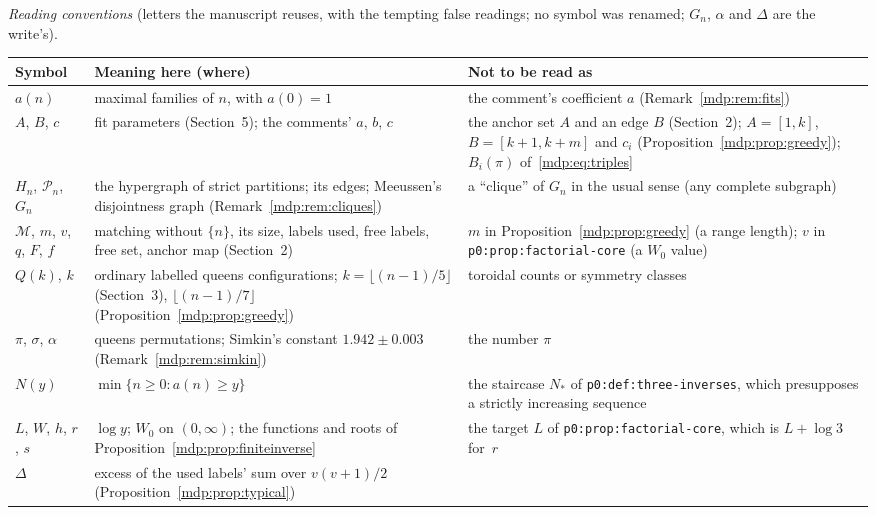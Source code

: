 \documentclass[11pt,letterpaper]{article}
\numberwithin{equation}{section}
\theoremstyle{remark}\newtheorem{remark}[theorem]{Remark}
\newcommand{\file}[1]{\nolinkurl{#1}}
\begin{document}
\medskip\noindent\begin{minipage}{\textwidth}
\emph{Reading conventions} (letters the manuscript reuses, with the tempting
false readings; no symbol was renamed; $G_n$, $\alpha$ and $\Delta$ are the
write's).\par
\smallskip
\begingroup\small\renewcommand{\arraystretch}{1.1}
\noindent\begin{tabular}{@{}>{\raggedright\arraybackslash}p{0.95in}>{\raggedright\arraybackslash}p{3.0in}>{\raggedright\arraybackslash}p{2.15in}@{}}
\toprule
Symbol & Meaning here (where) & Not to be read as\\
\midrule
$a(n)$ & maximal families of $n$, with $a(0)=1$ & the comment's coefficient $a$ (Remark~\ref{mdp:rem:fits})\\
$A$, $B$, $c$ & fit parameters (Section~5); the comments' $a$, $b$, $c$ & the anchor set $A$ and an edge $B$ (Section~2); $A=[1,k]$, $B=[k+1,k+m]$ and $c_i$ (Proposition~\ref{mdp:prop:greedy}); $B_i(\pi)$ of~\eqref{mdp:eq:triples}\\
$H_n$, $\mathcal P_n$, $G_n$ & the hypergraph of strict partitions; its edges; Meeussen's disjointness graph (Remark~\ref{mdp:rem:cliques}) & a ``clique'' of $G_n$ in the usual sense (any complete subgraph)\\
$\mathcal M$, $m$, $v$, $q$, $F$, $f$ & matching without $\{n\}$, its size, labels used, free labels, free set, anchor map (Section~2) & $m$ in Proposition~\ref{mdp:prop:greedy} (a range length); $v$ in \file{p0:prop:factorial-core} (a $W_0$ value)\\
$Q(k)$, $k$ & ordinary labelled queens configurations; $k=\lfloor(n-1)/5\rfloor$ (Section~3), $\lfloor(n-1)/7\rfloor$ (Proposition~\ref{mdp:prop:greedy}) & toroidal counts or symmetry classes\\
$\pi$, $\sigma$, $\alpha$ & queens permutations; Simkin's constant $1.942\pm0.003$ (Remark~\ref{mdp:rem:simkin}) & the number $\pi$\\
$N(y)$ & $\min\{n\ge0:a(n)\ge y\}$ & the staircase $N_\ast$ of \file{p0:def:three-inverses}, which presupposes a strictly increasing sequence\\
$L$, $W$, $h$, $r$, $s$ & $\log y$; $W_0$ on $(0,\infty)$; the functions and roots of Proposition~\ref{mdp:prop:finiteinverse} & the target $L$ of \file{p0:prop:factorial-core}, which is $L+\log3$ for~$r$\\
$\Delta$ & excess of the used labels' sum over $v(v+1)/2$ (Proposition~\ref{mdp:prop:typical}) & \\
\bottomrule
\end{tabular}
\endgroup
\end{minipage}
\end{document}
